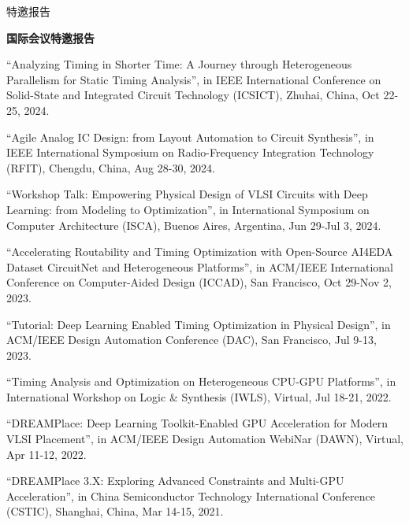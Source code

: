\begin{rSection}{特邀报告}


\textbf{国际会议特邀报告}
        
\begin{description}[font=\normalfont]

\item[{[T11]}]{
``Analyzing Timing in Shorter Time: A Journey through Heterogeneous Parallelism for Static Timing Analysis'', in IEEE International Conference on Solid-State and Integrated Circuit Technology (ICSICT), Zhuhai, China, Oct 22-25, 2024. 
}

\item[{[T10]}]{
``Agile Analog IC Design: from Layout Automation to Circuit Synthesis'', in IEEE International Symposium on Radio-Frequency Integration Technology (RFIT), Chengdu, China, Aug 28-30, 2024. 
}

\item[{[T9]}]{
``Workshop Talk: Empowering Physical Design of VLSI Circuits with Deep Learning: from Modeling to Optimization'', in International Symposium on Computer Architecture (ISCA), Buenos Aires, Argentina, Jun 29-Jul 3, 2024. 
}

\item[{[T8]}]{
``Accelerating Routability and Timing Optimization with Open-Source AI4EDA Dataset CircuitNet and Heterogeneous Platforms'', in ACM/IEEE International Conference on Computer-Aided Design (ICCAD), San Francisco, Oct 29-Nov 2, 2023. 
}

\item[{[T7]}]{
``Tutorial: Deep Learning Enabled Timing Optimization in Physical Design'', in ACM/IEEE Design Automation Conference (DAC), San Francisco, Jul 9-13, 2023. 
}

\item[{[T6]}]{
``Timing Analysis and Optimization on Heterogeneous CPU-GPU Platforms'', in International Workshop on Logic \& Synthesis (IWLS), Virtual, Jul 18-21, 2022. 
}

\item[{[T5]}]{
``DREAMPlace: Deep Learning Toolkit-Enabled GPU Acceleration for Modern VLSI Placement'', in ACM/IEEE Design Automation WebiNar (DAWN), Virtual, Apr 11-12, 2022. 
}

\item[{[T4]}]{
``DREAMPlace 3.X: Exploring Advanced Constraints and Multi-GPU Acceleration'', in China Semiconductor Technology International Conference (CSTIC), Shanghai, China, Mar 14-15, 2021. 
}


\end{description}
\end{rSection}
